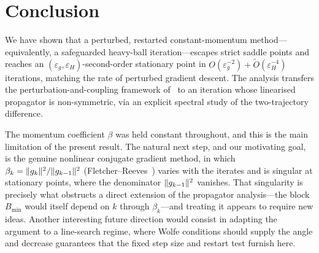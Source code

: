 \documentclass[11pt]{article}
\theoremstyle{plain}
\theoremstyle{definition}
\theoremstyle{remark}
\DeclarePairedDelimiter{\norm}{\lVert}{\rVert}
\newcommand{\eps}{\varepsilon}
\newcommand{\epsg}{\eps_{g}}
\newcommand{\epsH}{\eps_{H}}
\newcommand{\Bmin}{B_{\min}}
\newcommand{\Otil}{\widetilde{O}}
\begin{document}
\section{Conclusion}
\label{sec:conclusion}
 
We have shown that a perturbed, restarted constant-momentum
method---equivalently, a safeguarded heavy-ball iteration---escapes
strict saddle points and reaches an $(\epsg,\epsH)$-second-order
stationary point in $O(\epsg^{-2})+\Otil(\epsH^{-4})$ iterations,
matching the rate of perturbed gradient descent. The analysis transfers
the perturbation-and-coupling framework of~\cite{pmlr-v70-jin17a,pmlr-v75-jin18a} to an
iteration whose linearised propagator is non-symmetric, via an explicit
spectral study of the two-trajectory difference.
 
The momentum coefficient $\beta$ was held constant throughout, and this
is the main limitation of the present result. The natural next step, and
our motivating goal, is the genuine nonlinear conjugate gradient method,
in which $\beta_{k}=\norm{g_{k}}^{2}/\norm{g_{k-1}}^{2}$
(Fletcher--Reeves~\cite{Fletcher1964FunctionMB}) varies with the iterates
and is singular at stationary points, where the denominator
$\norm{g_{k-1}}^{2}$ vanishes. That singularity is precisely what
obstructs a direct extension of the propagator analysis---the block
$\Bmin$ would itself depend on $k$ through $\beta_{k}$---and treating it
appears to require new ideas. Another interesting future direction would consist in adapting the argument to a line-search
regime, where Wolfe conditions should supply the angle and decrease
guarantees that the fixed step size and restart test furnish here.
 


 
\end{document}
